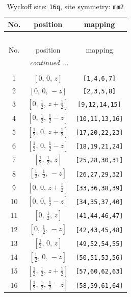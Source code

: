 \documentclass[fleqn,8pt]{jsarticle}
\begin{document}
\renewcommand{\arraystretch}{1.2}
\begin{longtable}{ccc}
\caption{Wyckoff site: {\tt 16q}, site symmetry: {\tt mm2}}
 \\
 \hline \hline
No. & position & mapping \\ \hline \endfirsthead

\multicolumn{2}{l}{\tablename\ \thetable{}} \\
 \hline \hline
No. & position & mapping \\ \hline \endhead

 \hline \hline
\multicolumn{2}{r}{\footnotesize\it continued ...} \\ \endfoot

 \hline \hline
\multicolumn{2}{r}{} \\ \endlastfoot

1 & $\left[ 0,\, 0,\, z \right]$ & {\tt [1,4,6,7]} \\ \hline
2 & $\left[ 0,\, 0,\, - z \right]$ & {\tt [2,3,5,8]} \\ \hline
3 & $\left[ 0,\, \frac{1}{2},\, z + \frac{1}{2} \right]$ & {\tt [9,12,14,15]} \\ \hline
4 & $\left[ 0,\, \frac{1}{2},\, \frac{1}{2} - z \right]$ & {\tt [10,11,13,16]} \\ \hline
5 & $\left[ \frac{1}{2},\, 0,\, z + \frac{1}{2} \right]$ & {\tt [17,20,22,23]} \\ \hline
6 & $\left[ \frac{1}{2},\, 0,\, \frac{1}{2} - z \right]$ & {\tt [18,19,21,24]} \\ \hline
7 & $\left[ \frac{1}{2},\, \frac{1}{2},\, z \right]$ & {\tt [25,28,30,31]} \\ \hline
8 & $\left[ \frac{1}{2},\, \frac{1}{2},\, - z \right]$ & {\tt [26,27,29,32]} \\ \hline
9 & $\left[ 0,\, 0,\, z + \frac{1}{2} \right]$ & {\tt [33,36,38,39]} \\ \hline
10 & $\left[ 0,\, 0,\, \frac{1}{2} - z \right]$ & {\tt [34,35,37,40]} \\ \hline
11 & $\left[ 0,\, \frac{1}{2},\, z \right]$ & {\tt [41,44,46,47]} \\ \hline
12 & $\left[ 0,\, \frac{1}{2},\, - z \right]$ & {\tt [42,43,45,48]} \\ \hline
13 & $\left[ \frac{1}{2},\, 0,\, z \right]$ & {\tt [49,52,54,55]} \\ \hline
14 & $\left[ \frac{1}{2},\, 0,\, - z \right]$ & {\tt [50,51,53,56]} \\ \hline
15 & $\left[ \frac{1}{2},\, \frac{1}{2},\, z + \frac{1}{2} \right]$ & {\tt [57,60,62,63]} \\ \hline
16 & $\left[ \frac{1}{2},\, \frac{1}{2},\, \frac{1}{2} - z \right]$ & {\tt [58,59,61,64]} \\
\end{longtable}
\end{document}
